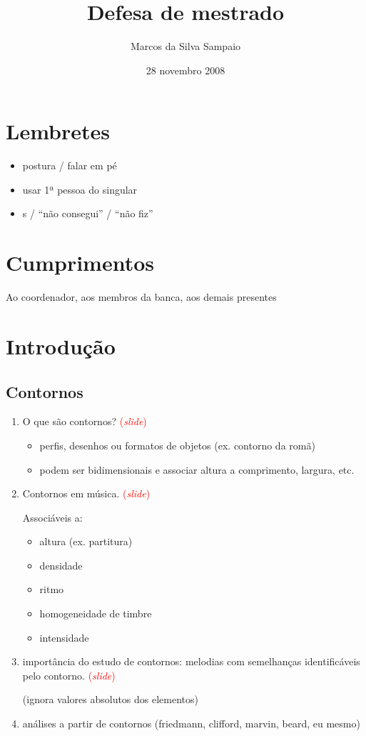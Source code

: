 \documentclass[12pt,a4paper]{article}
\title{Defesa de mestrado}
\author{Marcos da Silva Sampaio}
\date{28 novembro 2008}
\newcommand{\slide}{\textcolor{red}{(\textit{slide})}}
\begin{document}
\maketitle
\thispagestyle{empty}

\section*{Lembretes}

\begin{itemize}
\item postura / falar em pé
\item usar 1ª pessoa do singular
\item s / ``não consegui'' / ``não fiz''
\end{itemize}

\section*{Cumprimentos}

Ao coordenador, aos membros da banca, aos demais presentes

\section{Introdução}

\subsection{Contornos}

\begin{enumerate}
\item O que são contornos? \slide{}
  \begin{itemize}
  \item perfis, desenhos ou formatos de objetos (ex. contorno da romã)
  \item podem ser bidimensionais e associar altura a comprimento,
    largura, etc.
  \end{itemize}
\item Contornos em música. \slide{}

  Associáveis a:
  \begin{itemize}
  \item altura (ex. partitura)
  \item densidade
  \item ritmo
  \item homogeneidade de timbre
  \item intensidade
  \end{itemize}
\item importância do estudo de contornos: melodias com semelhanças
  identificáveis pelo contorno. \slide{}

  (ignora valores absolutos dos elementos)
\item análises a partir de contornos (friedmann, clifford, marvin, beard, eu mesmo)
\end{enumerate}
\end{document}
